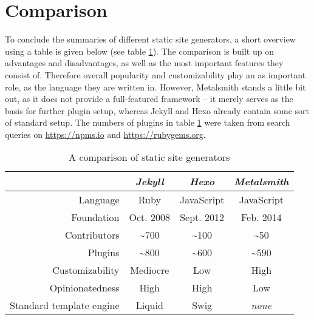\section{Comparison}
\label{sec:comparison}

To conclude the summaries of different static site generators, a short overview using a table is given below (see table \ref{table:comparison}). The comparison is built up on advantages and disadvantages, as well as the most important features they consist of. Therefore overall popularity and customizability play an as important role, as the language they are written in. However, Metalsmith stands a little bit out, as it does not provide a full-featured framework -- it merely serves as the basis for further plugin setup, whereas Jekyll and Hexo already contain some sort of standard setup.
The numbers of plugins in table \ref{table:comparison} were taken from search queries on \url{https://npms.io} and \url{https://rubygems.org}.

\begin{table}[h]
  \caption{A comparison of static site generators}
  \label{table:comparison}
  \centering
  \setlength{\tabcolsep}{5mm}
  \def\arraystretch{1.25}
  \begin{tabular}{|r||c|c|c|}
    \hline
    & \emph{Jekyll} & \emph{Hexo} & \emph{Metalsmith} \\
    \hline
    \hline
    Language & Ruby & JavaScript & JavaScript \\
    \hline
    Foundation & Oct. 2008 & Sept. 2012 & Feb. 2014 \\
    \hline
    Contributors & \textasciitilde 700 & \textasciitilde 100 & \textasciitilde 50 \\
    \hline
    Plugins & \textasciitilde 800 & \textasciitilde 600 & \textasciitilde 590 \\
    \hline
    Customizability & Mediocre & Low & High \\
    \hline
    Opinionatedness & High & High & Low \\
    \hline
    Standard template engine & Liquid & Swig & \emph{none} \\
    \hline
  \end{tabular}

\end{table}
